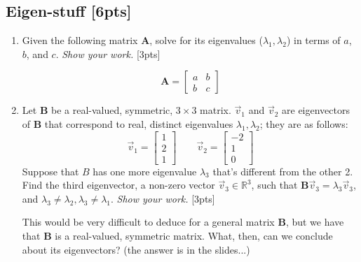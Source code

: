 \subsection{Eigen-stuff [6pts]}
\begin{enumerate}[label=\alph*.]
    \item Given the following matrix $\boldsymbol{A}$, solve for its eigenvalues ($\lambda_1, \lambda_2$) in terms of $a$, $b$, and $c$. \emph{Show your work.} [3pts]

    $$\boldsymbol{A}=\begin{bmatrix}
        a & b \\
        b & c
    \end{bmatrix}$$

    \item Let $\boldsymbol{B}$ be a real-valued, symmetric, $3 \times 3$ matrix. $\vec{v}_1$ and $\vec{v}_2$ are eigenvectors of $\boldsymbol{B}$ that correspond to real, distinct eigenvalues $\lambda_1, \lambda_2$; they are as follows:
    $$\vec{v}_1 = \begin{bmatrix}1 \\ 2 \\ 1\end{bmatrix} \qquad \vec{v}_2 = \begin{bmatrix}-2 \\ 1 \\ 0\end{bmatrix}$$
    Suppose that $B$ has one more eigenvalue $\lambda_3$ that's different from the other 2. Find the third eigenvector, a non-zero vector $\vec{v}_3 \in \mathbb{R}^3$, such that $\boldsymbol{B}\vec{v}_3 = \lambda_3\vec{v}_3$, and $\lambda_3 \neq \lambda_2, \lambda_3 \neq \lambda_1$. \emph{Show your work.} [3pts]

    \begin{hintbox}

        This would be very difficult to deduce for a general matrix $\boldsymbol{B}$, but we have that $\boldsymbol{B}$ is a real-valued, symmetric matrix. What, then, can we conclude about its eigenvectors? (the answer is in the slides...)
    \end{hintbox}
\end{enumerate}
\newpage
